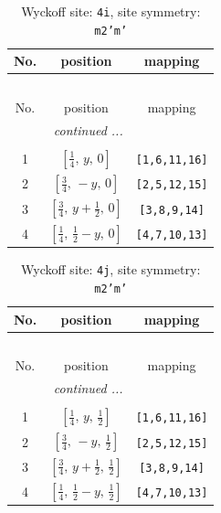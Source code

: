 \documentclass[fleqn,8pt]{jsarticle}
\begin{document}
\renewcommand{\arraystretch}{1.2}
\begin{longtable}{ccc}
\caption{Wyckoff site: {\tt 4i}, site symmetry: {\tt m2'm'}}
 \\
 \hline \hline
No. & position & mapping \\ \hline \endfirsthead

\multicolumn{2}{l}{\tablename\ \thetable{}} \\
 \hline \hline
No. & position & mapping \\ \hline \endhead

 \hline \hline
\multicolumn{2}{r}{\footnotesize\it continued ...} \\ \endfoot

 \hline \hline
\multicolumn{2}{r}{} \\ \endlastfoot

1 & $\left[ \frac{1}{4},\, y,\, 0 \right]$ & {\tt [1,6,11,16]} \\ \hline
2 & $\left[ \frac{3}{4},\, - y,\, 0 \right]$ & {\tt [2,5,12,15]} \\ \hline
3 & $\left[ \frac{3}{4},\, y + \frac{1}{2},\, 0 \right]$ & {\tt [3,8,9,14]} \\ \hline
4 & $\left[ \frac{1}{4},\, \frac{1}{2} - y,\, 0 \right]$ & {\tt [4,7,10,13]} \\
\end{longtable}
\renewcommand{\arraystretch}{1.2}
\begin{longtable}{ccc}
\caption{Wyckoff site: {\tt 4j}, site symmetry: {\tt m2'm'}}
 \\
 \hline \hline
No. & position & mapping \\ \hline \endfirsthead

\multicolumn{2}{l}{\tablename\ \thetable{}} \\
 \hline \hline
No. & position & mapping \\ \hline \endhead

 \hline \hline
\multicolumn{2}{r}{\footnotesize\it continued ...} \\ \endfoot

 \hline \hline
\multicolumn{2}{r}{} \\ \endlastfoot

1 & $\left[ \frac{1}{4},\, y,\, \frac{1}{2} \right]$ & {\tt [1,6,11,16]} \\ \hline
2 & $\left[ \frac{3}{4},\, - y,\, \frac{1}{2} \right]$ & {\tt [2,5,12,15]} \\ \hline
3 & $\left[ \frac{3}{4},\, y + \frac{1}{2},\, \frac{1}{2} \right]$ & {\tt [3,8,9,14]} \\ \hline
4 & $\left[ \frac{1}{4},\, \frac{1}{2} - y,\, \frac{1}{2} \right]$ & {\tt [4,7,10,13]} \\
\end{longtable}
\end{document}
